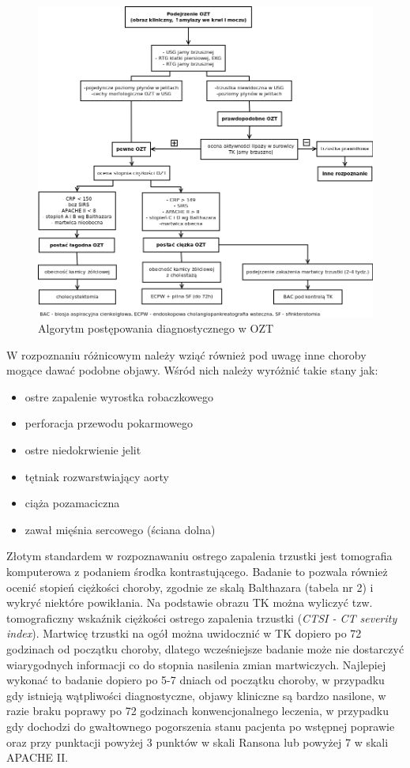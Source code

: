 \documentclass[a4paper, 12pt]{report}
\begin{document}
\begin{figure}[!h]
\centering
\includegraphics[scale=0.4]{pan-diag}
\caption{Algorytm postępowania diagnostycznego w OZT\cite{szczeklik}}
\end{figure}

W rozpoznaniu różnicowym należy wziąć również pod uwagę inne choroby
mogące dawać podobne objawy. Wśród nich należy wyróżnić takie stany jak: 
\begin{itemize} 
\setlength{\itemsep}{0cm}
\setlength{\parskip}{0cm}
\item ostre zapalenie wyrostka robaczkowego 
\item perforacja przewodu pokarmowego
\item ostre niedokrwienie jelit
\item tętniak rozwarstwiający aorty
\item ciąża pozamaciczna
\item zawał mięśnia sercowego (ściana dolna)
\end{itemize}

Złotym standardem w rozpoznawaniu ostrego zapalenia trzustki jest
tomografia komputerowa z podaniem środka kontrastującego. Badanie to
pozwala również ocenić stopień ciężkości choroby, zgodnie ze skalą
Balthazara (tabela nr 2) i wykryć niektóre powikłania. Na podstawie
obrazu TK można wyliczyć tzw. tomograficzny wskaźnik ciężkości ostrego
zapalenia trzustki (\textsl{CTSI - CT severity index}). Martwicę
trzustki na ogół można uwidocznić w TK dopiero po 72 godzinach od
początku choroby, dlatego wcześniejsze badanie może nie dostarczyć
wiarygodnych informacji co do stopnia nasilenia zmian
martwiczych. Najlepiej wykonać to badanie dopiero po 5-7 dniach od
początku choroby, w przypadku gdy istnieją wątpliwości diagnostyczne,
objawy kliniczne są bardzo nasilone, w razie braku poprawy po 72
godzinach konwencjonalnego leczenia, w przypadku gdy dochodzi do
gwałtownego pogorszenia stanu pacjenta po wstępnej poprawie oraz przy
punktacji powyżej 3 punktów w skali Ransona lub powyżej 7 w skali
APACHE II.
\end{document}

